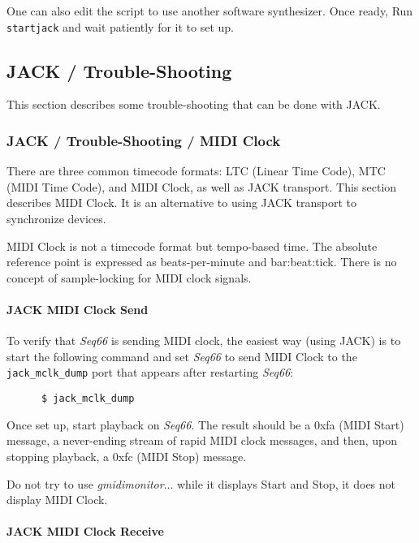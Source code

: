    One can also edit the script to use another software synthesizer.
   Once ready, 
   Run \texttt{startjack} and wait patiently for it to set up.

\subsection{JACK / Trouble-Shooting}
\label{subsec:jack_testing}

   This section describes some trouble-shooting that can be done with JACK.

\subsubsection{JACK / Trouble-Shooting / MIDI Clock}
\label{subsubsec:jack_testing_midi_clock}

   There are three common timecode formats: LTC (Linear Time Code),
   MTC (MIDI Time Code), and MIDI Clock, as well
   as JACK transport.
   This section describes MIDI Clock.
   It is an alternative to using JACK transport to synchronize devices.

   MIDI Clock is not a timecode format but tempo-based time. The absolute
   reference point is expressed as beats-per-minute and bar:beat:tick.
   There is no concept of sample-locking for MIDI clock signals.

\paragraph{JACK MIDI Clock Send}
\label{paragraph:jack_testing_midi_clock_send}

   To verify that \textsl{Seq66} is sending MIDI clock, the easiest way (using
   JACK) is to start the following command and set \textsl{Seq66} to send
   MIDI Clock to the \texttt{jack\_mclk\_dump} port
   that appears after restarting
   \textsl{Seq66}:

   \begin{verbatim}
      $ jack_mclk_dump
   \end{verbatim}

   Once set up, start playback on \textsl{Seq66}.
   The result should be a 0xfa (MIDI Start) message,
   a never-ending stream of rapid MIDI clock messages,
   and then, upon stopping playback, a 0xfc (MIDI Stop) message.

   Do not try to use \textsl{gmidimonitor}... while it displays Start and Stop,
   it does not display MIDI Clock.

\paragraph{JACK MIDI Clock Receive}
\label{paragraph:jack_testing_midi_clock_receive}


